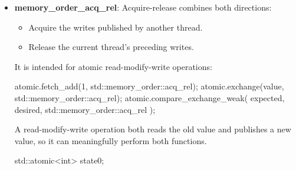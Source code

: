 \documentclass{report}
\begin{document}
\begin{itemize}
            A pure store does not read a value, so it cannot acquire anything.
        \item \textbf{memory\_order\_acq\_rel}: Acquire-release combines both directions:
            \begin{itemize}
                \item Acquire the writes published by another thread.
                \item Release the current thread’s preceding writes.
            \end{itemize}
            It is intended for atomic read-modify-write operations:
            \bigbreak \noindent 
            \begin{cppcode}
                atomic.fetch_add(1, std::memory_order::acq_rel);
                atomic.exchange(value, std::memory_order::acq_rel);
                atomic.compare_exchange_weak(
                    expected,
                    desired,
                    std::memory_order::acq_rel
                );
            \end{cppcode}
            \bigbreak \noindent 
            A read-modify-write operation both reads the old value and publishes a new value, so it can meaningfully perform both functions.
            \bigbreak \noindent 
            \begin{cppcode}
                std::atomic<int> state{0};


\end{cppcode}
\end{itemize}
\end{document}
